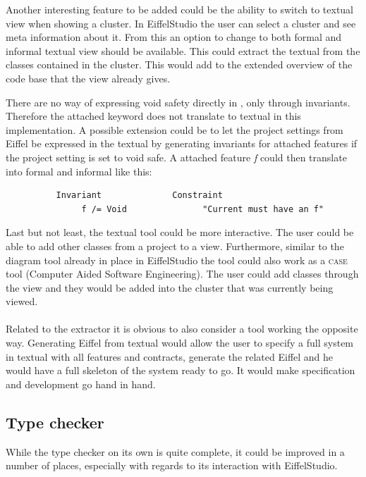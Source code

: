 Another interesting feature to be added could be the ability to switch to textual \bon{ } view when showing a cluster. In EiffelStudio the user can select a cluster and see meta information about it. From this an option to change to both formal and informal textual \bon{ } view should be available. This could extract the textual \bon{ } from the classes contained in the cluster. This would add to the extended overview of the code base that the \bon{ } view already gives.

There are no way of expressing void safety directly in \bon, only through invariants. Therefore the attached keyword does not translate to textual \bon{ } in this implementation. A possible extension could be to let the project settings from Eiffel be expressed in the textual \bon{ } by generating invariants for attached features if the project setting is set to void safe. A attached feature \textit{f} could then translate into formal and informal \bon{ } like this:
\footnotesize
\begin{verbatim}
          Invariant              Constraint
               f /= Void               "Current must have an f"
\end{verbatim}

\normalsize Last but not least, the textual \bon{ } tool could be more interactive. The user could be able to add other classes from a project to a \bon{ } view. Furthermore, similar to the diagram tool already in place in EiffelStudio the \bon{ } tool could also work as a \textsc{case} tool (Computer Aided Software Engineering). The user could add classes through the \bon{ } view and they would be added into the cluster that was currently being viewed.

\paragraph{}
Related to the \bon{ } extractor it is obvious to also consider a tool working the opposite way. Generating Eiffel from textual \bon{ } would allow the user to specify a full system in textual \bon{ } with all features and contracts, generate the related Eiffel and he would have a full skeleton of the system ready to go. It would make specification and development go hand in hand.

\subsection{Type checker}
While the type checker on its own is quite complete, it could be improved in a number of places, especially with regards to its interaction with EiffelStudio.

